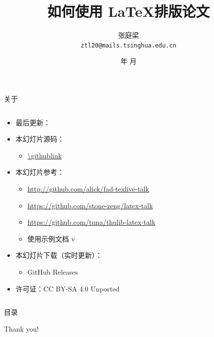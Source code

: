 \documentclass[xcolor=table,dvipsnames,svgnames,aspectratio=169,fontset=windows]{ctexbeamer}
\title{如何使用 \LaTeX 排版论文}
\author[张庭梁]{\vspace{1em} 张庭梁\\ \texttt{ztl20@mails.tsinghua.edu.cn}}
\institute{清华大学未来交互学生兴趣团队}
\date[未来交互系列讲座]{\the\year 年 \the\month 月}
\let\\\relax
\newcommand\link[1]{\href{#1}{\faLink}}
\begin{document}
\begin{frame}
  \titlepage
\end{frame}


\begin{frame}{关于}
  \begin{columns}[c]
    \begin{column}{.7\textwidth}
      \begin{itemize}
        \item 最后更新：\texttt{\DTMnow}
        \item 本幻灯片源码：
          \begin{itemize}
            \item \url{\githublink}
          \end{itemize}
        \item 本幻灯片参考：
          \begin{itemize}
            \item \url{http://github.com/alick/fad-texlive-talk}
            \item \url{https://github.com/stone-zeng/latex-talk}
            \item \url{https://github.com/tuna/thulib-latex-talk}
            \item \ThuThesis{} 使用示例文档 v\ThuThesisVersion
          \end{itemize}
        \item 本幻灯片下载（实时更新）：
          \begin{itemize}
            \item GitHub Releases \link{\githublink/releases}
          \end{itemize}
        \item 许可证：CC BY-SA 4.0 Unported \ccbysa
      \end{itemize}
    \end{column}
    \begin{column}{.3\textwidth}
      \qrcode[hyperlink, height=4cm]{\thudownloadlink}
    \end{column}
  \end{columns}
\end{frame}


\begin{frame}{目录}
  \tableofcontents
\end{frame}







\begin{frame}
  \begin{center}
    {\Huge\calligra Thank you!} %
  \end{center}
\end{frame}
\end{document}
